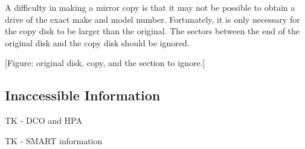A difficulty in making a mirror copy is that it may not be possible to
obtain a drive of the exact make and model number. Fortunately, it is
only necessary for the copy disk to be larger than the original. The
sectors between the end of the original disk and the copy disk should
be ignored.

[Figure: original disk, copy, and the section to ignore.]

\subsection{Inaccessible Information}

TK - DCO and HPA

TK - SMART information

